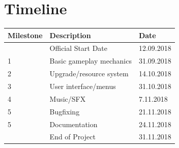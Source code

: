 \documentclass[a4paper]{scrreprt}
\begin{document}
  



\chapter{Timeline}
\begin{table}[h]
\centering
\begin{tabular}{|l|l|l|}
\hline
\textbf{Milestone} & \textbf{Description} & \textbf{Date} \\\hline
& Official Start Date & 12.09.2018 \\
1 & Basic gameplay mechanics  & 31.09.2018 \\
2 & Upgrade/resource system  & 14.10.2018 \\
3 & User interface/menus &31.10.2018 \\
4 & Music/SFX & 7.11.2018 \\
5 & Bugfixing & 21.11.2018 \\
5 & Documentation & 24.11.2018 \\
& End of Project & 31.11.2018 \\
\hline
\end{tabular}
\end{table}
\end{document}

